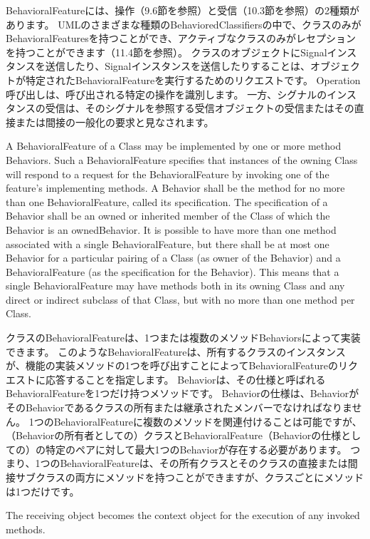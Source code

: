 \documentclass[a4paper,11pt]{ltjsarticle}
\begin{document}
BehavioralFeatureには、操作（9.6節を参照）と受信（10.3節を参照）の2種類があります。
UMLのさまざまな種類のBehavioredClassifiersの中で、クラスのみがBehavioralFeaturesを持つことができ、アクティブなクラスのみがレセプションを持つことができます（11.4節を参照）。
クラスのオブジェクトにSignalインスタンスを送信したり、Signalインスタンスを送信したりすることは、オブジェクトが特定されたBehavioralFeatureを実行するためのリクエストです。
Operation呼び出しは、呼び出される特定の操作を識別します。
一方、シグナルのインスタンスの受信は、そのシグナルを参照する受信オブジェクトの受信またはその直接または間接の一般化の要求と見なされます。

A BehavioralFeature of a Class may be implemented by one or more method Behaviors. 
Such a BehavioralFeature specifies that instances of the owning Class will respond to a request for the BehavioralFeature by invoking one of the feature’s implementing methods. 
A Behavior shall be the method for no more than one BehavioralFeature, called its specification. 
The specification of a Behavior shall be an owned or inherited member of the Class of which the Behavior is an ownedBehavior. 
It is possible to have more than one method associated with a single BehavioralFeature, but there shall be at most one Behavior for a particular pairing of a Class (as owner of the Behavior) and a BehavioralFeature (as the specification for the Behavior). 
This means that a single BehavioralFeature may have methods both in its owning Class and any direct or indirect subclass of that Class, but with no more than one method per Class.

クラスのBehavioralFeatureは、1つまたは複数のメソッドBehaviorsによって実装できます。
このようなBehavioralFeatureは、所有するクラスのインスタンスが、機能の実装メソッドの1つを呼び出すことによってBehavioralFeatureのリクエストに応答することを指定します。
Behaviorは、その仕様と呼ばれるBehavioralFeatureを1つだけ持つメソッドです。
Behaviorの仕様は、BehaviorがそのBehaviorであるクラスの所有または継承されたメンバーでなければなりません。
1つのBehavioralFeatureに複数のメソッドを関連付けることは可能ですが、（Behaviorの所有者としての）クラスとBehavioralFeature（Behaviorの仕様としての）の特定のペアに対して最大1つのBehaviorが存在する必要があります。
つまり、1つのBehavioralFeatureは、その所有クラスとそのクラスの直接または間接サブクラスの両方にメソッドを持つことができますが、クラスごとにメソッドは1つだけです。

The receiving object becomes the context object for the execution of any invoked methods.
\end{document}
